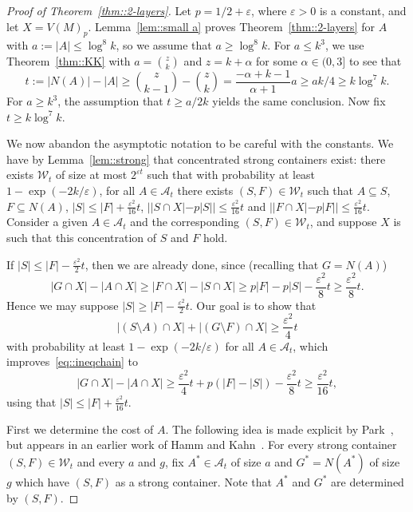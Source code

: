 \documentclass[12pt]{article}
\newcommand{\ep}{\varepsilon}
\newcommand{\A}{\mathcal{A}}
\begin{document}
\begin{proof}[Proof of Theorem~\ref{thm::2-layers}]
Let $p = 1/2+\ep$, where $\ep>0$ is a constant, and let $X = V(M)_p$. Lemma~\ref{lem::small a} proves Theorem~\ref{thm::2-layers} for $A$ with $a := |A| \leq \log^8 k$, so we assume that $a \geq \log^8 k$. For $a \leq k^3$, we use Theorem~\ref{thm::KK} with $a = \binom{z}{k}$ and $z = k+\alpha$ for some $\alpha \in (0,3]$ to see that
\[ t := |N(A)| - |A| \geq \binom{z}{k-1} - \binom{z}{k} = \frac{-\alpha+k-1}{\alpha+1} a \geq ak/4 \geq k \log^7 k .\]
For $a \geq k^3$, the assumption that $t \geq a/2k$ yields the same conclusion. Now fix $t \geq k \log^7 k$.


We now abandon the asymptotic notation to be careful with the constants. We have by Lemma~\ref{lem::strong} that concentrated strong containers exist: there exists $\mathcal{W}_t$ of size at most $2^{\ep t}$ such that with probability at least $1-\exp(-2k/\ep)$, for all $A \in \A_t$ there exists $(S,F) \in \mathcal{W}_t$ such that $A \subseteq S$, $F \subseteq N(A)$, $|S| \leq |F| + \frac{\ep^2}{16} t$, $||S \cap X|-p|S|| \leq \frac{\ep^2}{16} t$ and $||F \cap X|-p|F|| \leq \frac{\ep^2}{16} t$. Consider a given $A \in \A_t$ and the corresponding $(S,F) \in \mathcal{W}_t$, and suppose $X$ is such that this concentration of $S$ and $F$ hold.

If $|S| \leq |F| - \frac{\ep^2}{2} t$, then we are already done, since (recalling that $G = N(A)$)
\begin{equation}\label{eq::ineqchain}
|G \cap X| - |A \cap X| \geq |F \cap X| - |S \cap X| \geq p|F| - p|S| - \frac{\ep^2}{8} t \geq \frac{\ep^2}{8} t .
\end{equation}
Hence we may suppose $|S| \geq |F| - \frac{\ep^2}{2} t$. Our goal is to show that
\begin{equation}\label{eq::bad}
|(S \setminus A) \cap X| + |(G \setminus F) \cap X| \geq \frac{\ep^2}{4} t
\end{equation}
with probability at least $1-\exp(-2k/\ep)$ for all $A \in \A_t$, which improves~\eqref{eq::ineqchain} to
\[ |G \cap X| - |A \cap X| \geq \frac{\ep^2}{4}t + p(|F|-|S|) - \frac{\ep^2}{8} t \geq \frac{\ep^2}{16} t ,\]
using that $|S| \leq |F| + \frac{\ep^2}{16} t$.

First we determine the cost of $A$. The following idea is made explicit by Park~\cite{Par}, but appears in an earlier work of Hamm and Kahn~\cite{HK2}. For every strong container $(S,F) \in \mathcal{W}_t$ and every $a$ and $g$, fix $A^* \in \A_t$ of size $a$ and $G^* = N(A^*)$ of size $g$ which have $(S,F)$ as a strong container. Note that $A^*$ and $G^*$ are determined by $(S,F)$.


\end{proof}
\end{document}
